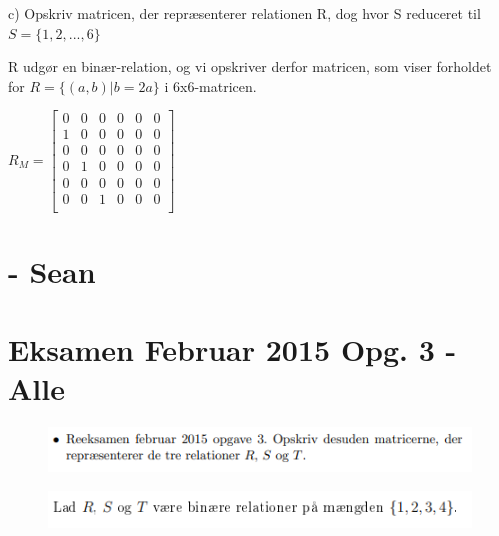 \documentclass{article}
\begin{document}
c) Opskriv matricen, der repræsenterer relationen R, dog hvor S reduceret til $S = \{1,2,...,6\}$

R udgør en binær-relation, og vi opskriver derfor matricen, som viser forholdet for $R = \{ (a,b)  |  b = 2a\}$ i 6x6-matricen.

\begin{center}
\begin{math}
R_M = \begin{bmatrix}
0 & 0 & 0 & 0 & 0 & 0\\
1 & 0 & 0 & 0 & 0 & 0\\
0 & 0 & 0 & 0 & 0 & 0\\
0 & 1 & 0 & 0 & 0 & 0\\
0 & 0 & 0 & 0 & 0 & 0\\
0 & 0 & 1 & 0 & 0 & 0\\

\end{bmatrix}
\end{math}
\end{center}









\section{- Sean}

\section{Eksamen Februar 2015 Opg. 3 - Alle}
\begin{figure}[h]
\begin{center}
\includegraphics[scale=0.9]{2015Opgave3Formulering}
\end{center}
\end{figure}
\begin{figure}[h]
\begin{center}
\includegraphics[scale=0.9]{2015Opgave3FormuleringOver}
\end{center}
\end{figure}
\end{document}
